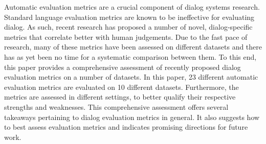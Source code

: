 Automatic evaluation metrics are a crucial component of dialog systems research. Standard language evaluation metrics are known to be ineffective for evaluating dialog. As such, recent research has proposed a number of novel, dialog-specific metrics that correlate better with human judgements. Due to the fast pace of research, many of these metrics have been assessed on different datasets and there has as yet been no time for a systematic comparison between them. To this end, this paper provides a comprehensive assessment of recently proposed dialog evaluation metrics on a number of datasets. In this paper, 23 different automatic evaluation metrics are evaluated on 10 different datasets. Furthermore, the metrics are assessed in different settings, to better qualify their respective strengths and weaknesses. This comprehensive assessment offers several takeaways pertaining to dialog evaluation metrics in general. It also suggests how to best assess evaluation metrics and indicates promising directions for future work.
